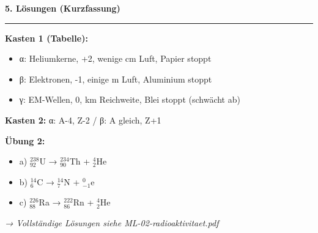\documentclass[11pt, a4paper]{article}
\newcommand{\abschnitt}[1]{%
    \vspace{10pt}\noindent\textbf{\textcolor{physik}{\large #1}}\vspace{6pt}\hrule\vspace{8pt}
}
\begin{document}
\vspace{12pt}

\abschnitt{5. Lösungen (Kurzfassung)}

\textbf{Kasten 1 (Tabelle):}
\begin{itemize}[leftmargin=2em]
\item α: Heliumkerne, +2, wenige cm Luft, Papier stoppt
\item β: Elektronen, -1, einige m Luft, Aluminium stoppt
\item γ: EM-Wellen, 0, km Reichweite, Blei stoppt (schwächt ab)
\end{itemize}

\textbf{Kasten 2:} α: A-4, Z-2 / β: A gleich, Z+1

\textbf{Übung 2:}
\begin{itemize}[leftmargin=2em]
\item a) $^{238}_{92}$U → $^{234}_{90}$Th + $^{4}_{2}$He
\item b) $^{14}_{6}$C → $^{14}_{7}$N + $^{0}_{-1}$e
\item c) $^{226}_{88}$Ra → $^{222}_{86}$Rn + $^{4}_{2}$He
\end{itemize}

\vspace{8pt}
\textit{→ Vollständige Lösungen siehe ML-02-radioaktivitaet.pdf}
\end{document}
